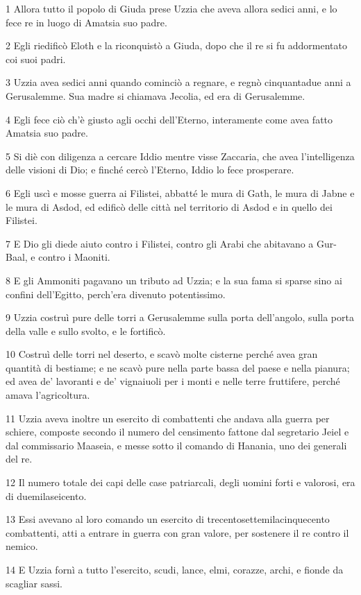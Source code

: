 \par 1 Allora tutto il popolo di Giuda prese Uzzia che aveva allora sedici anni, e lo fece re in luogo di Amatsia suo padre.
\par 2 Egli riedificò Eloth e la riconquistò a Giuda, dopo che il re si fu addormentato coi suoi padri.
\par 3 Uzzia avea sedici anni quando cominciò a regnare, e regnò cinquantadue anni a Gerusalemme. Sua madre si chiamava Jecolia, ed era di Gerusalemme.
\par 4 Egli fece ciò ch'è giusto agli occhi dell'Eterno, interamente come avea fatto Amatsia suo padre.
\par 5 Si diè con diligenza a cercare Iddio mentre visse Zaccaria, che avea l'intelligenza delle visioni di Dio; e finché cercò l'Eterno, Iddio lo fece prosperare.
\par 6 Egli uscì e mosse guerra ai Filistei, abbatté le mura di Gath, le mura di Jabne e le mura di Asdod, ed edificò delle città nel territorio di Asdod e in quello dei Filistei.
\par 7 E Dio gli diede aiuto contro i Filistei, contro gli Arabi che abitavano a Gur-Baal, e contro i Maoniti.
\par 8 E gli Ammoniti pagavano un tributo ad Uzzia; e la sua fama si sparse sino ai confini dell'Egitto, perch'era divenuto potentissimo.
\par 9 Uzzia costruì pure delle torri a Gerusalemme sulla porta dell'angolo, sulla porta della valle e sullo svolto, e le fortificò.
\par 10 Costruì delle torri nel deserto, e scavò molte cisterne perché avea gran quantità di bestiame; e ne scavò pure nella parte bassa del paese e nella pianura; ed avea de' lavoranti e de' vignaiuoli per i monti e nelle terre fruttifere, perché amava l'agricoltura.
\par 11 Uzzia aveva inoltre un esercito di combattenti che andava alla guerra per schiere, composte secondo il numero del censimento fattone dal segretario Jeiel e dal commissario Maaseia, e messe sotto il comando di Hanania, uno dei generali del re.
\par 12 Il numero totale dei capi delle case patriarcali, degli uomini forti e valorosi, era di duemilaseicento.
\par 13 Essi avevano al loro comando un esercito di trecentosettemilacinquecento combattenti, atti a entrare in guerra con gran valore, per sostenere il re contro il nemico.
\par 14 E Uzzia fornì a tutto l'esercito, scudi, lance, elmi, corazze, archi, e fionde da scagliar sassi.
